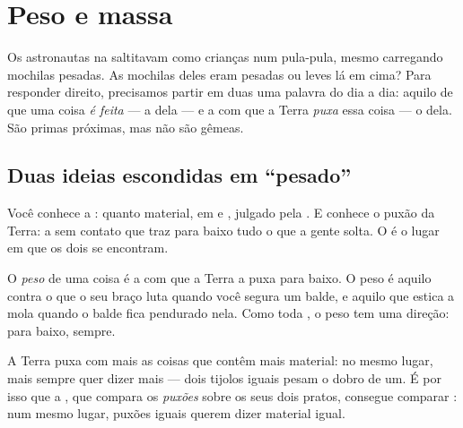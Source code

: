 \chapter{Peso e massa}\label{ch:g4:weight-and-mass}

Os astronautas na  saltitavam como crianças num pula-pula, mesmo
carregando mochilas pesadas. As mochilas deles eram pesadas ou leves
lá em cima? Para responder direito, precisamos partir em duas uma
palavra do dia a dia: aquilo de que uma coisa \emph{é feita} --- a
 dela --- e a  com que a Terra \emph{puxa} essa coisa --- o
 dela. São primas próximas, mas não são gêmeas.

\section{Duas ideias escondidas em ``pesado''}

Você conhece a : quanto material, em  e ,
julgado pela . E conhece o puxão da Terra: a 
sem contato que traz para baixo tudo o que a gente solta. O  é o
lugar em que os dois se encontram.

\begin{definition}[Peso]\label{def:g4:weight-and-mass:weight}
O \emph{peso} de uma coisa é a  com que a Terra a
puxa para baixo. O peso é aquilo contra o que o seu braço luta quando
você segura um balde, e aquilo que estica a mola quando o balde fica
pendurado nela. Como toda , o peso tem uma direção: para baixo,
sempre.
\end{definition}

\begin{proposition}\label{prop:g4:weight-and-mass:morestuff}
A Terra puxa com mais  as coisas que contêm mais material: no
mesmo lugar, mais  sempre quer dizer mais  --- dois tijolos
iguais pesam o dobro de um. É por isso que a , que
compara os \emph{puxões} sobre os seus dois pratos, consegue comparar
\emph{}: num mesmo lugar, puxões iguais querem dizer material
igual.
\end{proposition}


